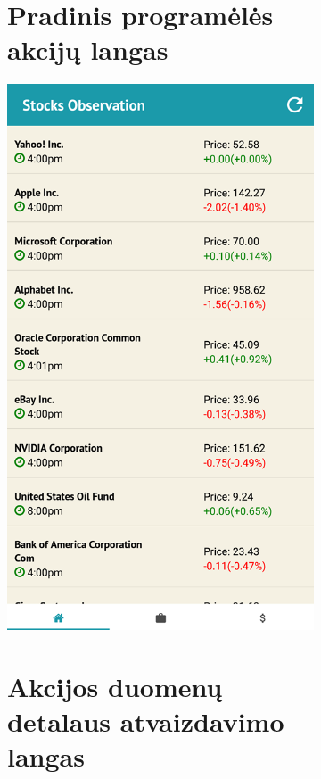\documentclass[a4paper,12pt,fleqn]{article}
\begin{document}
\begin{appendices}
\begin{figure}
	\begin{subfigure}{0.5\textwidth}
		\centering
		\tocless\section{Pradinis programėlės akcijų langas}
		\includegraphics[width=0.8\linewidth]{home.png}
		\label{app:priedas7}
	\end{subfigure}
	\begin{subfigure}{0.5\textwidth}
		\centering
		\tocless\section{Akcijos duomenų detalaus atvaizdavimo langas}

\end{subfigure}
\end{figure}
\end{appendices}
\end{document}
